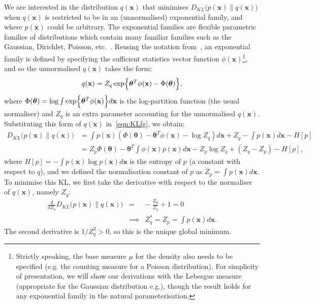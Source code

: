 \documentclass[twoside,11pt]{article}
\def\x{{\mathbf x}}
\def\boldtheta{\bm{\theta}}
\begin{document}
We are interested in the distribution $q(\x)$ that minimises $D_{KL}\bigl(p(\x) \parallel q(\x)\bigr)$ when $q(\x)$ is restricted to be in an (unnormalised) exponential family, and where $p(\x)$ could be arbitrary. The exponential families are flexible parametric families of distributions which contain many familiar families such as the Gaussian, Dirichlet, Poisson, etc.~\cite[]{bishopBook,seeger03phd}. Reusing the notation from~\cite{seeger03phd}, an exponential family is defined by specifying the sufficient statistics vector function $\phi(\x)$\footnote{Strictly speaking, the base measure $\mu$ for the density also needs to be specified (e.g. the counting measure for a Poisson distribution). For simplicity of presentation, we will show our derivations with the Lebesgue measure (appropriate for the Gaussian distribution e.g.), though the result holds for any exponential family in the natural parameterisation.}, and so the unnormalised $q(\x)$ takes the form:
%
\begin{equation}
\label{eqn:expfam2}
q(\x) = Z_q\exp\Bigl\{\boldtheta^T\phi(\x) -
\Phi(\boldtheta)\Bigr\},
\end{equation}
%
where $\Phi(\boldtheta) =
\log\int\exp\Bigl\{\boldtheta^T\phi(\x)\Bigr\}d\x$ is the log-partition function (the usual normaliser) and $Z_q$ is an extra parameter accounting for the unnormalised $q(\x)$. Substituting this form of $q(\x)$ in~\eqref{eqn:KLfg}, we obtain:
\begin{align}
\label{eqn:KLpq}
D_{KL}\bigl(p(\x) \parallel q(\x)\bigr)
& = \int p(\x) \left(\Phi(\boldtheta) - \boldtheta^T\phi(\x) - \log{Z_q} \right)d\x +Z_q-\int p(\x)d\x - H[p] \\
& = Z_p \Phi(\boldtheta) - \boldtheta^T \int \phi(\x) p(\x) d\x  - Z_p \log{Z_q} + (Z_q-Z_p) - H[p],
\end{align}
where $H[p] = -\int p(\x) \log{p(\x)} d\x$ is the entropy of $p$ (a constant with respect to $q$), and we defined the normalisation constant of $p$ as $Z_p = \int p(\x) d\x$. To minimise this KL, we
first take the derivative with respect to the normaliser of $q(\x)$,
namely $Z_q$:
\begin{eqnarray}
\label{eqn:dZ}
\frac{d}{dZ_q}D_{KL}\bigl(p(\x) \parallel q(\x)\bigr)
& = & -~\frac{Z_p}{Z_q} + 1 = 0 \\
\label{eqn:Zstar}
& \implies & Z_q^* = Z_p = \int p(\x)d\x.
\end{eqnarray}
The second derivative is $1/Z_q^2 > 0$, so this is the unique global minimum.
\end{document}
